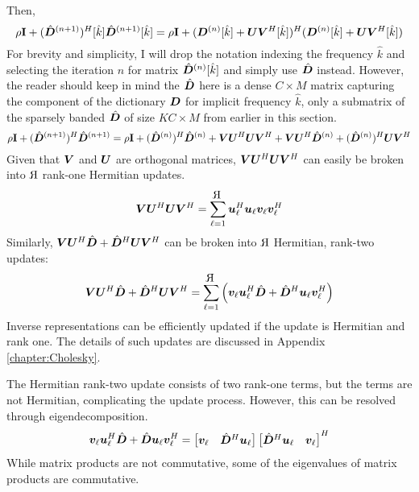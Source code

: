 Then,
%
\begin{equation}
\rho{\bf I} + (\hat{\bm{D}}^{(n + 1)})^H[\hat{k}]\hat{\bm{D}}^{(n + 1)}[\hat{k}] = \rho{\bf I} + (\bm{D}^{(n)}[\hat{k}] + \bm{U}\bm{V}^H[\hat{k}])^H(\bm{D}^{(n)}[\hat{k}] + \bm{U}\bm{V}^H[\hat{k}])
\end{equation}
%
For brevity and simplicity, I will drop the notation indexing the frequency $\hat{k}$ and selecting the iteration $n$ for matrix $\hat{\bm{D}}^{(n)}[\hat{k}]$ and simply use $\hat{\bm{D}}$ instead. However, the reader should keep in mind the $\hat{\bm{D}}$ here is a dense $C \times M$ matrix capturing the component of the dictionary $\bm{D}$ for implicit frequency $\hat{k}$, only a submatrix of the sparsely banded $\hat{\bm{D}}$ of size $KC \times M$ from earlier in this section.
%
\begin{equation}
\rho{\bf I} + (\hat{\bm{D}}^{(n + 1)})^H\hat{\bm{D}}^{(n + 1)} = \rho{\bf I} + (\hat{\bm{D}}^{(n)})^H\hat{\bm{D}}^{(n)} + \bm{V}\bm{U}^H \bm{U}\bm{V}^H + \bm{V}\bm{U}^H\hat{\bm{D}}^{(n)} + (\hat{\bm{D}}^{(n)})^H\bm{U}\bm{V}^H
\end{equation}
%
Given that $\bm{V}$ and $\bm{U}$ are orthogonal matrices, $\bm{V}\bm{U}^H\bm{U}\bm{V}^H$ can easily be broken into $
\reflectbox{R}$ rank-one Hermitian updates.
%
\begin{equation}
\mV\mU^H\mU\mV^H = \sum_{\ell = 1}^{
\reflectbox{R}} \vu_{\ell}^H\vu_{\ell}\vv_{\ell}\vv_{\ell}^H
\end{equation}
%
Similarly, $\bm{V}\bm{U}^H\hat{\bm{D}} + \hat{\bm{D}}^H\bm{U}\bm{V}^H$ can be broken into $
\reflectbox{R}$ Hermitian, rank-two updates:
%
\begin{equation}
\mV\mU^H\hat{\mD} + \hat{\mD}^H\mU\mV^H = \sum_{\ell = 1}^{
\reflectbox{R}} \left( \vv_{\ell}\vu_{\ell}^H\hat{\mD} + \hat{\mD}^H\vu_{\ell}\vv_{\ell}^H \right)
\end{equation}
%
%
Inverse representations can be efficiently updated if the update is Hermitian and rank one. The details of such updates are discussed in Appendix \ref{chapter:Cholesky}.

The Hermitian rank-two update consists of two rank-one terms, but the terms are not Hermitian, complicating the update process. However, this can be resolved through eigendecomposition.  
%
\begin{equation}
\bm{v}_{\ell}\bm{u}_{\ell}^H \hat{\bm{D}} + \hat{\bm{D}}\bm{u}_{\ell}\bm{v}_{\ell}^H = \begin{bmatrix}
\bm{v}_{\ell} & \hat{\bm{D}}^H\bm{u}_{\ell} 
\end{bmatrix}
\begin{bmatrix}
\hat{\bm{D}}^H\bm{u}_{\ell} & \bm{v}_{\ell}
\end{bmatrix}^H
\end{equation}
%
While matrix products are not commutative, some of the eigenvalues of matrix products are commutative.

